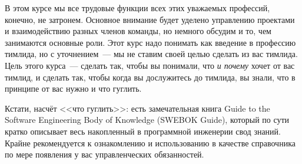 \documentclass{../../text-style}
\begin{document}
В этом курсе мы все трудовые функции всех этих уважаемых профессий, конечно, не затронем. Основное внимание будет уделено управлению проектами и взаимодействию разных членов команды, но немного обсудим и то, чем занимаются основные роли. Этот курс надо понимать как введение в профессию тимлида, но с уточнением~--- мы не ставим своей целью сделать из вас тимлида. Цель этого курса~--- сделать так, чтобы вы понимали, что \emph{и почему} хочет от вас тимлид, и сделать так, чтобы когда вы дослужитесь до тимлида, вы знали, что в принципе от вас нужно и что гуглить.

Кстати, насчёт <<что гуглить>>: есть замечательная книга Guide to the Software Engineering Body of Knowledge (SWEBOK Guide), который по сути кратко описывает весь накопленный в программной инженерии свод знаний. Крайне рекомендуется к ознакомлению и использованию в качестве справочника по мере появления у вас управленческих обязанностей.
\end{document}
